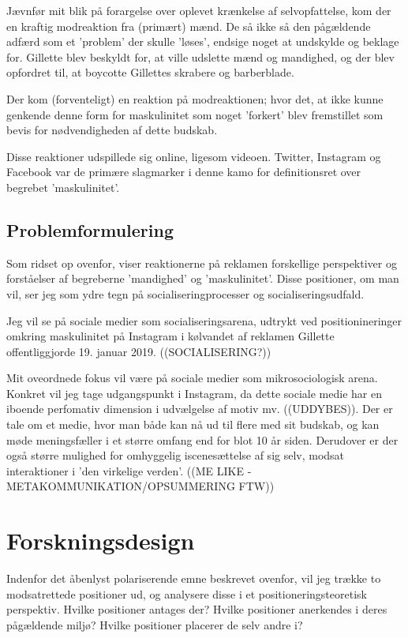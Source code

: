Jævnfør mit blik på forargelse over oplevet krænkelse af
selvopfattelse, kom der en kraftig modreaktion fra (primært) mænd.
De så ikke så den pågældende adfærd som et 'problem' der skulle
'løses', endsige noget at undskylde og beklage for. Gillette blev
beskyldt for, at ville udslette mænd og mandighed, og der blev
opfordret til, at boycotte Gillettes skrabere og barberblade. 

Der kom (forventeligt) en reaktion på modreaktionen; hvor det, at
ikke kunne genkende denne form for maskulinitet som noget
'forkert' blev fremstillet som bevis for nødvendigheden af dette
budskab. 

Disse reaktioner udspillede sig online, ligesom videoen. Twitter,
Instagram og Facebook var de primære slagmarker i denne kamo for
definitionsret over begrebet 'maskulinitet'.

\subsection{Problemformulering}

Som ridset op ovenfor, viser reaktionerne på reklamen forskellige
perspektiver og forståelser af begreberne 'mandighed' og
'maskulinitet'. Disse positioner, om man vil, ser jeg som ydre
tegn på socialiseringprocesser og socialiseringsudfald. 

Jeg vil se på sociale medier som socialiseringsarena, udtrykt ved
positionineringer omkring maskulinitet på Instagram i kølvandet af
reklamen Gillette offentliggjorde 19. januar 2019.
((SOCIALISERING?))


Mit oveordnede fokus vil være på sociale medier som
mikrosociologisk arena. Konkret vil jeg tage udgangspunkt i
Instagram, da dette sociale medie har en iboende perfomativ
dimension i udvælgelse af motiv mv.  ((UDDYBES)).  Der er tale om
et medie, hvor man både kan nå ud til flere med sit budskab, og
kan møde meningsfæller i et større omfang end for blot 10 år
siden.  Derudover er der også større mulighed for omhyggelig
iscenesættelse af sig selv, modsat interaktioner i 'den virkelige
verden'. ((ME LIKE - METAKOMMUNIKATION/OPSUMMERING FTW))

\section{Forskningsdesign} 

Indenfor det åbenlyst polariserende emne beskrevet ovenfor, vil
jeg trække to modsatrettede positioner ud, og analysere disse i et
positioneringsteoretisk perspektiv.  Hvilke positioner antages
der? Hvilke positioner anerkendes i deres pågældende miljø? Hvilke
positioner placerer de selv andre i?

